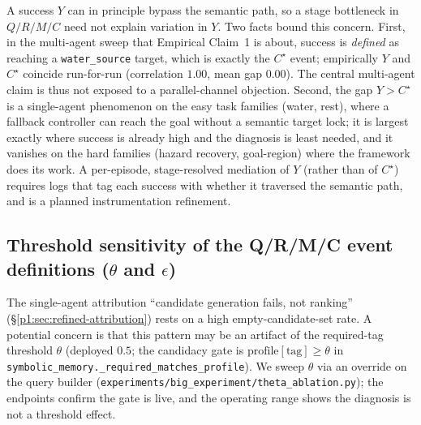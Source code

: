 \documentclass{article}
\newcommand{\method}[1]{\texttt{#1}}
\begin{document}
A success $Y$ can in principle bypass the semantic path, so a stage bottleneck in $Q/R/M/C$ need not explain variation in $Y$. Two facts bound this concern. First, in the multi-agent sweep that Empirical Claim~1 is about, success is \emph{defined} as reaching a \texttt{water\_source} target, which is exactly the $C^\star$ event; empirically $Y$ and $C^\star$ coincide run-for-run (correlation $1.00$, mean gap $0.00$). The central multi-agent claim is thus not exposed to a parallel-channel objection. Second, the gap $Y>C^\star$ is a single-agent phenomenon on the easy task families (water, rest), where a fallback controller can reach the goal without a semantic target lock; it is largest exactly where success is already high and the diagnosis is least needed, and it vanishes on the hard families (hazard recovery, goal-region) where the framework does its work. A per-episode, stage-resolved mediation of $Y$ (rather than of $C^\star$) requires logs that tag each success with whether it traversed the semantic path, and is a planned instrumentation refinement.

\subsection{Threshold sensitivity of the Q/R/M/C event definitions ($\theta$ and $\epsilon$)}
\label{p1:app:theta-robustness}

The single-agent attribution ``candidate generation fails, not ranking''
(\S\ref{p1:sec:refined-attribution}) rests on a high empty-candidate-set rate.
A potential concern is that this pattern may be an artifact of the required-tag threshold
$\theta$ (deployed $0.5$; the candidacy gate is
$\mathrm{profile}[\text{tag}]\ge\theta$ in
\method{symbolic\_memory.\_required\_matches\_profile}). We sweep $\theta$ via an
override on the query builder (\method{experiments/big\_experiment/theta\_ablation.py});
the endpoints confirm the gate is live, and the operating range shows the
diagnosis is not a threshold effect.
\end{document}
